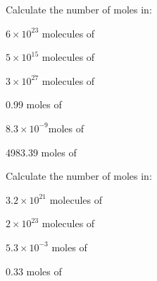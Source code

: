 \documentclass[main.tex]{subfiles}
\begin{document}
\begin{multicols*}{2}
\begin{question}[ID=\the\value{numA}]
Calculate the number of moles in:
\begin{inparaenum}[(a)]	
\item $6\times 10^{23}$ molecules of 	%
\item $5\times 10^{15}$ molecules of %
\item	$3\times 10^{27}$ molecules of 	%
\end{inparaenum} 
\end{question}
\begin{solution}
\begin{inparaenum}[(a)]	
\item  0.99 moles of 
\item  $8.3\times 10^{-9}$moles of 
\item	4983.39 moles of 
\end{inparaenum} 
\hspace{0.1cm}\end{solution}%
\begin{question}[ID=\the\value{numA}]
Calculate the number of moles in:
\begin{inparaenum}[(a)]	
\item  $3.2\times 10^{21}$ molecules of 	%
\item $2\times 10^{23}$ molecules of 		%
\end{inparaenum} 
\end{question}
\begin{solution}
\begin{inparaenum}[(a)]	
\item   $5.3\times 10^{-3}$ moles of 
\item  0.33 moles of 
\end{inparaenum} 
\hspace{0.1cm}\end{solution}%


\end{multicols*}
\end{document}
